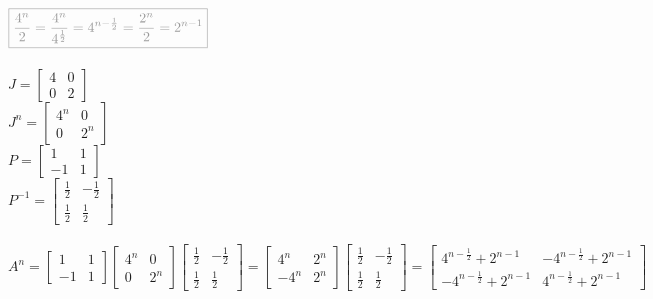 ${\color{lightgray}\boxed{      \frac{4^n}{2}=\frac{4^n}{4^\frac{1}{2}}=4^{n-\frac{1}{2}}=\frac{2^n}{2}=2^{n-1}      }}$\\
\\
$J=\left[ \begin{array}{cc}     4&0\\0&2    \end{array}\right]$\\
$J^n=\left[ \begin{array}{cc}     4^n&0\\0&2^n    \end{array}\right]$\\
$P=\left[ \begin{array}{cc}     1&1\\-1&1    \end{array}\right]$\\
$P^{-1}=\left[ \begin{array}{cc}     \frac{1}{2}&-\frac{1}{2}\\\frac{1}{2}&\frac{1}{2}    \end{array}\right]$\\
\\
$A^n=\left[ \begin{array}{cc}     1&1\\-1&1    \end{array}\right]
 \left[ \begin{array}{cc}     4^n&0\\0&2^n    \end{array}\right]
\left[ \begin{array}{cc}     \frac{1}{2}&-\frac{1}{2}\\\frac{1}{2}&\frac{1}{2}    \end{array}\right]
=
\left[ \begin{array}{cc}     4^n&2^n\\-4^n&2^n    \end{array}\right]
\left[ \begin{array}{cc}     \frac{1}{2}&-\frac{1}{2}\\\frac{1}{2}&\frac{1}{2}    \end{array}\right]
=
\left[ \begin{array}{cc}     
	4^{n-\frac{1}{2}}+2^{n-1}  &
	-4^{n-\frac{1}{2}}+2^{n-1} \\
	-4^{n-\frac{1}{2}}+2^{n-1} &
	4^{n-\frac{1}{2}}+2^{n-1}
\end{array}\right]
$\\















